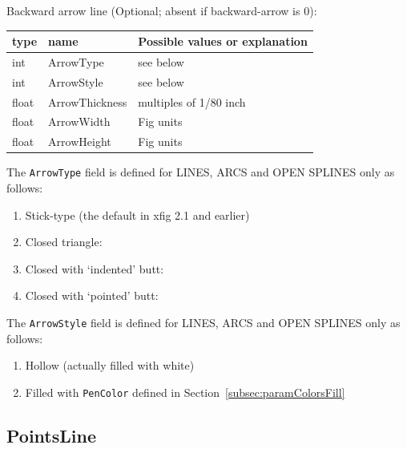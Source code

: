\documentclass[10pt, a4paper, english]{article}%
\begin{document}
Backward arrow line (Optional; absent if backward-arrow is 0): \\
%
\begin{tabular}{lll}
\toprule
type & name & Possible values or explanation \\
\midrule
\midrule
int    & ArrowType      & see below \\
int    & ArrowStyle     & see below \\
float  & ArrowThickness & multiples of 1/80 inch \\
float  & ArrowWidth     & Fig units \\
float  & ArrowHeight    & Fig units \\
\bottomrule
\end{tabular}

The \texttt{ArrowType} field is defined for LINES, ARCS and OPEN SPLINES only as follows:
%
\begin{enumerate}
\item[0] Stick-type (the default in xfig 2.1 and earlier)
\item    Closed triangle:
 \item   Closed with `indented' butt:
\item    Closed with `pointed' butt:
\end{enumerate}


The \texttt{ArrowStyle} field is defined for LINES, ARCS and OPEN SPLINES only 
as follows:
%
\begin{enumerate}
\item[0] Hollow (actually filled with white)
\item    Filled with \texttt{PenColor} defined in Section~\ref{subsec:paramColorsFill}
\end{enumerate}


\subsection{PointsLine}\label{subsec:paramPointsLine}
\end{document}
